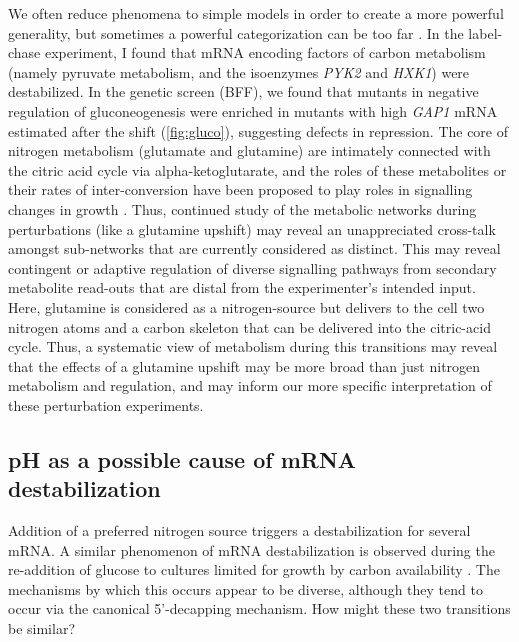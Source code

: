 We often reduce phenomena to simple models in order to
create a more powerful generality, but sometimes a
powerful categorization can be too far
\parencite{lazebnik2002can}.
In the label-chase experiment, I found that mRNA encoding factors of
carbon metabolism (namely pyruvate metabolism, and the isoenzymes 
\textit{PYK2} and \textit{HXK1}) were destabilized.
In the genetic screen (BFF), we found that mutants in negative
regulation of gluconeogenesis were enriched in mutants with high
\textit{GAP1} mRNA estimated after the shift
(\autoref{fig:gluco}), suggesting defects 
in repression. The core of nitrogen metabolism (glutamate and
glutamine) are intimately connected with the citric acid cycle via
alpha-ketoglutarate, and the roles of these metabolites or their
rates of inter-conversion have been proposed to play roles in
signalling changes in growth \parencite{fayyad2016yeast}.
Thus, continued study of the metabolic networks during perturbations
(like a glutamine upshift) may reveal an unappreciated cross-talk
amongst sub-networks that are currently considered as distinct. 
This may reveal contingent or adaptive regulation of diverse
signalling pathways from secondary metabolite read-outs that are
distal from the experimenter's intended input.
Here, glutamine is considered as a nitrogen-source but delivers to 
the cell two nitrogen atoms and a carbon skeleton that can be
delivered into the citric-acid cycle.
Thus, a systematic view of metabolism during this transitions may
reveal that the effects of a glutamine upshift may be more broad than
just nitrogen metabolism and regulation, and may inform our more
specific interpretation of these perturbation experiments.

\subsection{pH as a possible cause of mRNA destabilization}

Addition of a preferred nitrogen source triggers a destabilization 
for several mRNA. 
A similar phenomenon of mRNA destabilization is observed during the 
re-addition of glucose to cultures limited for growth by carbon 
availability \parencite{braun2016snf1}. 
The mechanisms by which this occurs appear to be diverse, although
they tend to occur via the canonical 5'-decapping mechanism.
How might these two transitions be similar?

